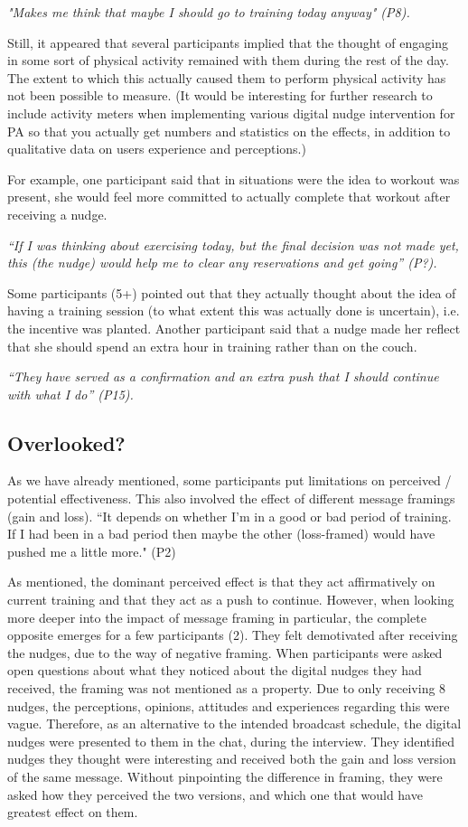 \textit{"Makes me think that maybe I should go to training today anyway" (P8).}

Still, it appeared that several participants implied that the thought of engaging in some sort of physical activity remained with them during the rest of the day. The extent to which this actually caused them to perform physical activity has not been possible to measure. (It would be interesting for further research to include activity meters when implementing various digital nudge intervention for PA so that you actually get numbers and statistics on the effects, in addition to qualitative data on users experience and perceptions.)

For example, one participant said that in situations were the idea to workout was present, she would feel more committed to actually complete that workout after receiving a nudge.

\textit{“If I was thinking about exercising today, but the final decision was not made yet,  this (the nudge) would help me to clear any reservations and get going” (P?).}

Some participants (5+) pointed out that they actually thought about the idea of having a training session (to what extent this was actually done is uncertain), i.e. the incentive was planted. Another participant said that a nudge made her reflect  that she should spend an extra hour in training rather than on the couch. 

\textit{“They have served as a confirmation and an extra push that I should continue with what I do” (P15).}

\subsection{Overlooked?}
As we have already mentioned, some participants put limitations on perceived / potential effectiveness. This also involved the effect of different message framings (gain and loss).
“It depends on whether I'm in a good or bad period of training. If I had been in a bad period then maybe the other (loss-framed) would have pushed me a little more." (P2)

As mentioned, the dominant perceived effect is that they act affirmatively on current training and that they act as a push to continue. However, when looking more deeper into the impact of message framing in particular, the complete opposite emerges for a few participants (2). They felt demotivated after receiving the nudges, due to the way of negative framing. 
When participants were asked open questions about what they noticed about the digital nudges they had received, the framing was not mentioned as a property. Due to only receiving 8 nudges, the perceptions, opinions, attitudes and experiences regarding this were vague. Therefore, as an alternative to the intended broadcast schedule, the digital nudges were presented to them in the chat, during the interview. They identified nudges they thought were interesting and received both the gain and loss version of the same message. Without pinpointing the difference in framing, they were asked how they perceived the two versions, and which one that would have greatest effect on them.

